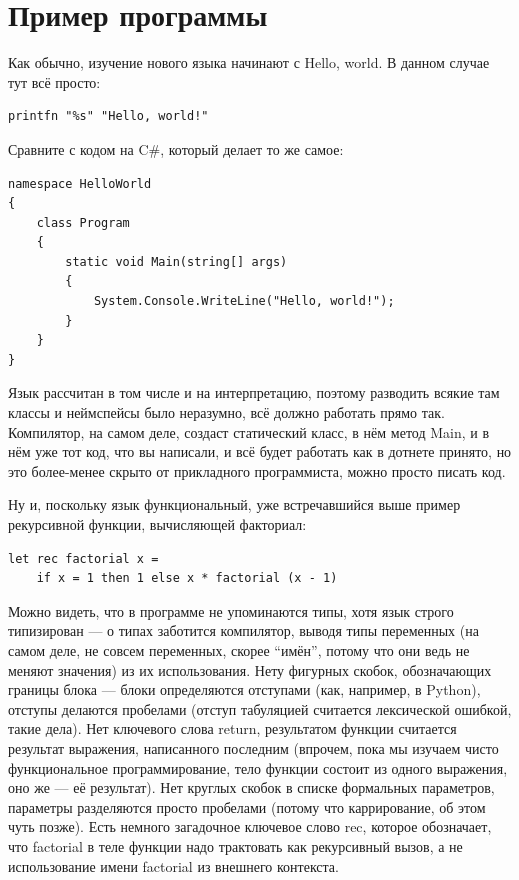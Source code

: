 \documentclass[a5paper]{article}
\begin{document}
\section{Пример программы}

Как обычно, изучение нового языка начинают с Hello, world. В данном случае тут всё просто:

\begin{verbatim}
printfn "%s" "Hello, world!"
\end{verbatim}

Сравните с кодом на C\#, который делает то же самое:

\begin{verbatim}
namespace HelloWorld
{
    class Program
    {
        static void Main(string[] args)
        {
            System.Console.WriteLine("Hello, world!");
        }
    }
}
\end{verbatim}

Язык рассчитан в том числе и на интерпретацию, поэтому разводить всякие там классы и неймспейсы было неразумно, всё должно работать прямо так. Компилятор, на самом деле, создаст статический класс, в нём метод Main, и в нём уже тот код, что вы написали, и всё будет работать как в дотнете принято, но это более-менее скрыто от прикладного программиста, можно просто писать код.

Ну и, поскольку язык функциональный, уже встречавшийся выше пример рекурсивной функции, вычисляющей факториал:

\begin{verbatim}
let rec factorial x =
    if x = 1 then 1 else x * factorial (x - 1)
\end{verbatim}

Можно видеть, что в программе не упоминаются типы, хотя язык строго типизирован --- о типах заботится компилятор, выводя типы переменных (на самом деле, не совсем переменных, скорее ``имён'', потому что они ведь не меняют значения) из их использования. Нету фигурных скобок, обозначающих границы блока --- блоки определяются отступами (как, например, в Python), отступы делаются пробелами (отступ табуляцией считается лексической ошибкой, такие дела). Нет ключевого слова return, результатом функции считается результат выражения, написанного последним (впрочем, пока мы изучаем чисто функциональное программирование, тело функции состоит из одного выражения, оно же --- её результат). Нет круглых скобок в списке формальных параметров, параметры разделяются просто пробелами (потому что каррирование, об этом чуть позже). Есть немного загадочное ключевое слово rec, которое обозначает, что factorial в теле функции надо трактовать как рекурсивный вызов, а не использование имени factorial из внешнего контекста.
\end{document}
